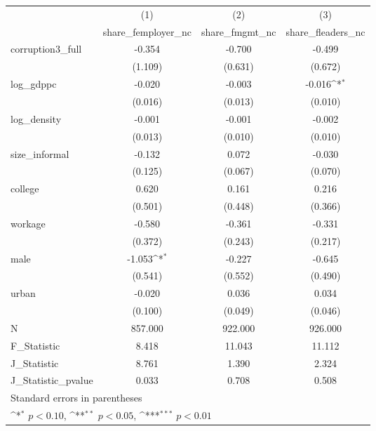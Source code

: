 {
\def\sym#1{\ifmmode^{#1}\else\(^{#1}\)\fi}
\begin{tabular}{l*{3}{c}}
\hline\hline
            &\multicolumn{1}{c}{(1)}&\multicolumn{1}{c}{(2)}&\multicolumn{1}{c}{(3)}\\
            &\multicolumn{1}{c}{share\_femployer\_nc}&\multicolumn{1}{c}{share\_fmgmt\_nc}&\multicolumn{1}{c}{share\_fleaders\_nc}\\
\hline
corruption3\_full&      -0.354         &      -0.700         &      -0.499         \\
            &     (1.109)         &     (0.631)         &     (0.672)         \\
[1em]
log\_gdppc   &      -0.020         &      -0.003         &      -0.016\sym{*}  \\
            &     (0.016)         &     (0.013)         &     (0.010)         \\
[1em]
log\_density &      -0.001         &      -0.001         &      -0.002         \\
            &     (0.013)         &     (0.010)         &     (0.010)         \\
[1em]
size\_informal&      -0.132         &       0.072         &      -0.030         \\
            &     (0.125)         &     (0.067)         &     (0.070)         \\
[1em]
college     &       0.620         &       0.161         &       0.216         \\
            &     (0.501)         &     (0.448)         &     (0.366)         \\
[1em]
workage     &      -0.580         &      -0.361         &      -0.331         \\
            &     (0.372)         &     (0.243)         &     (0.217)         \\
[1em]
male        &      -1.053\sym{*}  &      -0.227         &      -0.645         \\
            &     (0.541)         &     (0.552)         &     (0.490)         \\
[1em]
urban       &      -0.020         &       0.036         &       0.034         \\
            &     (0.100)         &     (0.049)         &     (0.046)         \\
\hline
N           &     857.000         &     922.000         &     926.000         \\
F\_Statistic &       8.418         &      11.043         &      11.112         \\
J\_Statistic &       8.761         &       1.390         &       2.324         \\
J\_Statistic\_pvalue&       0.033         &       0.708         &       0.508         \\
\hline\hline
\multicolumn{4}{l}{\footnotesize Standard errors in parentheses}\\
\multicolumn{4}{l}{\footnotesize \sym{*} \(p<0.10\), \sym{**} \(p<0.05\), \sym{***} \(p<0.01\)}\\
\end{tabular}
}
